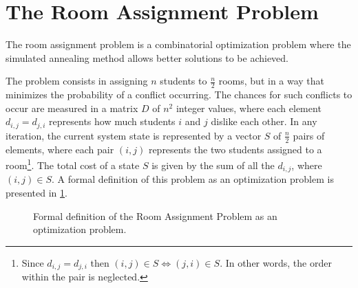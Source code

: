 \section{The Room Assignment Problem}
\label{sec:problem}

The room assignment problem is a combinatorial optimization problem where the simulated annealing method allows better solutions to be achieved.

The problem consists in assigning $n$ students to $\frac{n}{2}$ rooms, but in a way that minimizes the probability of a conflict occurring. The chances for such conflicts to occur are measured in a matrix $D$ of $n^{2}$ integer values, where each element $d_{i,j} = d_{j,i}$ represents how much students $i$ and $j$ dislike each other. In any iteration, the current system state is represented by a vector $S$ of $\frac{n}{2}$ pairs of elements, where each pair $(i,j)$ represents the two students assigned to a room\footnote{Since $d_{i,j}=d_{j,i}$ then $(i,j)\in S\Leftrightarrow(j,i)\in S$. In other words, the order within the pair is neglected.}. The total cost of a state $S$ is given by the sum of all the $d_{i,j}$, where $(i,j)\in S$. A formal definition of this problem as an optimization problem is presented in \cref{fig:formaldef}.

\begin{figure}
	\begin{center}
	\end{center}
	\caption{Formal definition of the Room Assignment Problem as an optimization problem.}
	\label{fig:formaldef}
\end{figure}

